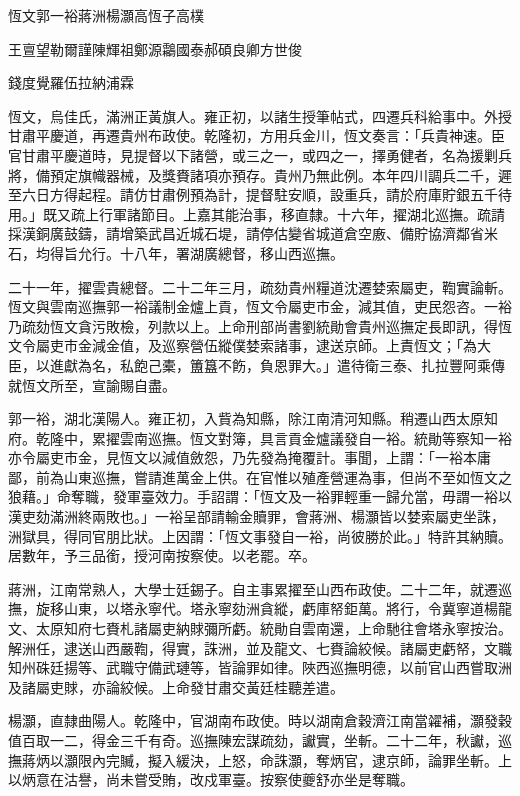 
\begin{pinyinscope}
恆文郭一裕蔣洲楊灝高恆子高樸

王亶望勒爾謹陳輝祖鄭源鸘國泰郝碩良卿方世俊

錢度覺羅伍拉納浦霖

恆文，烏佳氏，滿洲正黃旗人。雍正初，以諸生授筆帖式，四遷兵科給事中。外授甘肅平慶道，再遷貴州布政使。乾隆初，方用兵金川，恆文奏言：「兵貴神速。臣官甘肅平慶道時，見提督以下諸營，或三之一，或四之一，擇勇健者，名為援剿兵將，備預定旗幟器械，及獎賚諸項亦預存。貴州乃無此例。本年四川調兵二千，遲至六日方得起程。請仿甘肅例預為計，提督駐安順，設重兵，請於府庫貯銀五千待用。」既又疏上行軍諸節目。上嘉其能治事，移直隸。十六年，擢湖北巡撫。疏請採漢銅廣鼓鑄，請增築武昌近城石堤，請停估變省城道倉空廒、備貯協濟鄰省米石，均得旨允行。十八年，署湖廣總督，移山西巡撫。

二十一年，擢雲貴總督。二十二年三月，疏劾貴州糧道沈遷婪索屬吏，鞫實論斬。恆文與雲南巡撫郭一裕議制金爐上貢，恆文令屬吏市金，減其值，吏民怨咨。一裕乃疏劾恆文貪污敗檢，列款以上。上命刑部尚書劉統勛會貴州巡撫定長即訊，得恆文令屬吏市金減金值，及巡察營伍縱僕婪索諸事，逮送京師。上責恆文；「為大臣，以進獻為名，私飽己橐，簠簋不飭，負恩罪大。」遣待衛三泰、扎拉豐阿乘傳就恆文所至，宣諭賜自盡。

郭一裕，湖北漢陽人。雍正初，入貲為知縣，除江南清河知縣。稍遷山西太原知府。乾隆中，累擢雲南巡撫。恆文對簿，具言貢金爐議發自一裕。統勛等察知一裕亦令屬吏市金，見恆文以減值斂怨，乃先發為掩覆計。事聞，上謂：「一裕本庸鄙，前為山東巡撫，嘗請進萬金上供。在官惟以殖產營運為事，但尚不至如恆文之狼藉。」命奪職，發軍臺效力。手詔謂：「恆文及一裕罪輕重一歸允當，毋謂一裕以漢吏劾滿洲終兩敗也。」一裕呈部請輸金贖罪，會蔣洲、楊灝皆以婪索屬吏坐誅，洲獄具，得同官朋比狀。上因謂：「恆文事發自一裕，尚彼勝於此。」特許其納贖。居數年，予三品銜，授河南按察使。以老罷。卒。

蔣洲，江南常熟人，大學士廷錫子。自主事累擢至山西布政使。二十二年，就遷巡撫，旋移山東，以塔永寧代。塔永寧劾洲貪縱，虧庫帑鉅萬。將行，令冀寧道楊龍文、太原知府七賚札諸屬吏納賕彌所虧。統勛自雲南還，上命馳往會塔永寧按治。解洲任，逮送山西嚴鞫，得實，誅洲，並及龍文、七賚論絞候。諸屬吏虧帑，文職知州硃廷揚等、武職守備武璉等，皆論罪如律。陜西巡撫明德，以前官山西嘗取洲及諸屬吏賕，亦論絞候。上命發甘肅交黃廷桂聽差遣。

楊灝，直隸曲陽人。乾隆中，官湖南布政使。時以湖南倉穀濟江南當糴補，灝發穀值百取一二，得金三千有奇。巡撫陳宏謀疏劾，讞實，坐斬。二十二年，秋讞，巡撫蔣炳以灝限內完贓，擬入緩決，上怒，命誅灝，奪炳官，逮京師，論罪坐斬。上以炳意在沽譽，尚未嘗受賄，改戍軍臺。按察使夔舒亦坐是奪職。


\end{pinyinscope}
